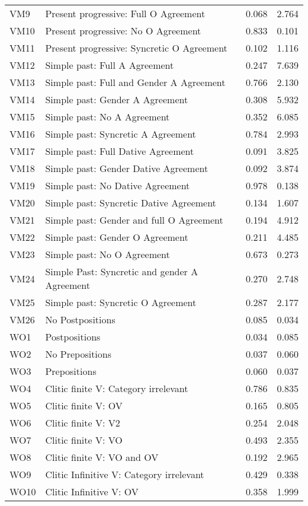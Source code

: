 \begin{longtable}{llll}
VM9 & Present progressive: Full O Agreement & 0.068 & 2.764\\
VM10 & Present progressive: No O Agreement & 0.833 & 0.101\\
VM11 & Present progressive: Syncretic O Agreement & 0.102 & 1.116\\
VM12 & Simple past: Full A Agreement & 0.247 & 7.639\\
VM13 & Simple past: Full and Gender A Agreement & 0.766 & 2.130\\
VM14 & Simple past: Gender A Agreement & 0.308 & 5.932\\
VM15 & Simple past: No A Agreement & 0.352 & 6.085\\
VM16 & Simple past: Syncretic A Agreement & 0.784 & 2.993\\
VM17 & Simple past: Full Dative Agreement & 0.091 & 3.825\\
VM18 & Simple past: Gender Dative Agreement & 0.092 & 3.874\\
VM19 & Simple past: No Dative Agreement & 0.978 & 0.138\\
VM20 & Simple past: Syncretic Dative Agreement & 0.134 & 1.607\\
VM21 & Simple past: Gender and full O Agreement & 0.194 & 4.912\\
VM22 & Simple past: Gender O Agreement & 0.211 & 4.485\\
VM23 & Simple past: No O Agreement & 0.673 & 0.273\\
VM24 & Simple Past: Syncretic and gender A Agreement & 0.270 & 2.748\\
VM25 & Simple past: Syncretic O Agreement & 0.287 & 2.177\\
VM26 & No Postpositions & 0.085 & 0.034\\
WO1 & Postpositions & 0.034 & 0.085\\
WO2 & No Prepositions & 0.037 & 0.060\\
WO3 & Prepositions & 0.060 & 0.037\\
WO4 & Clitic finite V: Category irrelevant & 0.786 & 0.835\\
WO5 & Clitic finite V: OV & 0.165 & 0.805\\
WO6 & Clitic finite V: V2 & 0.254 & 2.048\\
WO7 & Clitic finite V: VO & 0.493 & 2.355\\
WO8 & Clitic finite V: VO and OV & 0.192 & 2.965\\
WO9 & Clitic Infinitive V: Category irrelevant & 0.429 & 0.338\\
WO10 & Clitic Infinitive V: OV & 0.358 & 1.999\\

\end{longtable}
